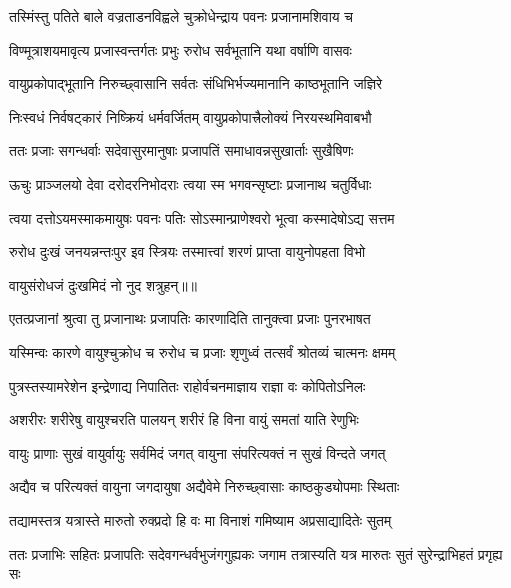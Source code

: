 \twolineshloka
{तस्मिंस्तु पतिते बाले वज्रताडनविह्वले}
{चुक्रोधेन्द्राय पवनः प्रजानामशिवाय च} %

\twolineshloka
{विण्मूत्राशयमावृत्य प्रजास्वन्तर्गतः प्रभुः}
{रुरोध सर्वभूतानि यथा वर्षाणि वासवः} %

\twolineshloka
{वायुप्रकोपाद्भूतानि निरुच्छ्वासानि सर्वतः}
{संधिभिर्भज्यमानानि काष्ठभूतानि जज्ञिरे} %

\twolineshloka
{निःस्वधं निर्वषट्कारं निष्क्रियं धर्मवर्जितम्}
{वायुप्रकोपात्त्रैलोक्यं निरयस्थमिवाबभौ} %

\twolineshloka
{ततः प्रजाः सगन्धर्वाः सदेवासुरमानुषाः}
{प्रजापतिं समाधावन्नसुखार्ताः सुखैषिणः} %

\twolineshloka
{ऊचुः प्राञ्जलयो देवा दरोदरनिभोदराः}
{त्वया स्म भगवन्सृष्टाः प्रजानाथ चतुर्विधाः} %

\twolineshloka
{त्वया दत्तोऽयमस्माकमायुषः पवनः पतिः}
{सोऽस्मान्प्राणेश्वरो भूत्वा कस्मादेषोऽद्य सत्तम} %

\twolineshloka
{रुरोध दुःखं जनयन्नन्तःपुर इव स्त्रियः}
{तस्मात्त्वां शरणं प्राप्ता वायुनोपहता विभो} %

{वायुसंरोधजं दुःखमिदं नो नुद शत्रुहन्॥॥} %

\addtocounter{shlokacount}{1}

\twolineshloka
{एतत्प्रजानां श्रुत्वा तु प्रजानाथः प्रजापतिः}
{कारणादिति तानुक्त्वा प्रजाः पुनरभाषत} %

\twolineshloka
{यस्मिन्वः कारणे वायुश्चुक्रोध च रुरोध च}
{प्रजाः शृणुध्वं तत्सर्वं श्रोतव्यं चात्मनः क्षमम्} %

\twolineshloka
{पुत्रस्तस्यामरेशेन इन्द्रेणाद्य निपातितः}
{राहोर्वचनमाज्ञाय राज्ञा वः कोपितोऽनिलः} %

\twolineshloka
{अशरीरः शरीरेषु वायुश्चरति पालयन्}
{शरीरं हि विना वायुं समतां याति रेणुभिः} %

\twolineshloka
{वायुः प्राणाः सुखं वायुर्वायुः सर्वमिदं जगत्}
{वायुना संपरित्यक्तं न सुखं विन्दते जगत्} %

\twolineshloka
{अद्यैव च परित्यक्तं वायुना जगदायुषा}
{अद्यैवेमे निरुच्छ्वासाः काष्ठकुड्योपमाः स्थिताः} %

\twolineshloka
{तद्यामस्तत्र यत्रास्ते मारुतो रुक्प्रदो हि वः}
{मा विनाशं गमिष्याम अप्रसाद्यादितेः सुतम्} %

\fourlineindentedshloka
{ततः प्रजाभिः सहितः प्रजापतिः}
{ सदेवगन्धर्वभुजंगगुह्यकः}
{जगाम तत्रास्यति यत्र मारुतः}
{ सुतं सुरेन्द्राभिहतं प्रगृह्य सः} %

